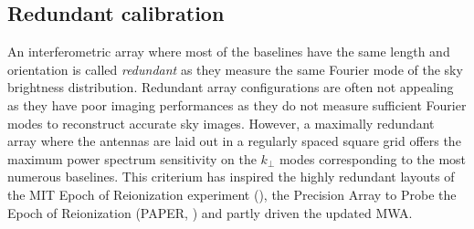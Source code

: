 \subsection{Redundant calibration}

An interferometric array where most of the baselines have the same length and orientation is called {\it redundant} as they measure the same Fourier mode of the sky brightness distribution. Redundant array configurations are often not appealing as they have poor imaging performances as they do not measure sufficient Fourier modes to reconstruct accurate sky images. However, a maximally redundant array where the antennas are laid out in a regularly spaced square grid offers the maximum power spectrum sensitivity on the $k_\perp$ modes corresponding to the most numerous baselines. This criterium has inspired the highly redundant layouts of the MIT Epoch of Reionization experiment (\cite{zheng14}), the Precision Array to Probe the Epoch of Reionization (PAPER, \cite{parsons12b}) and partly driven the updated MWA.

